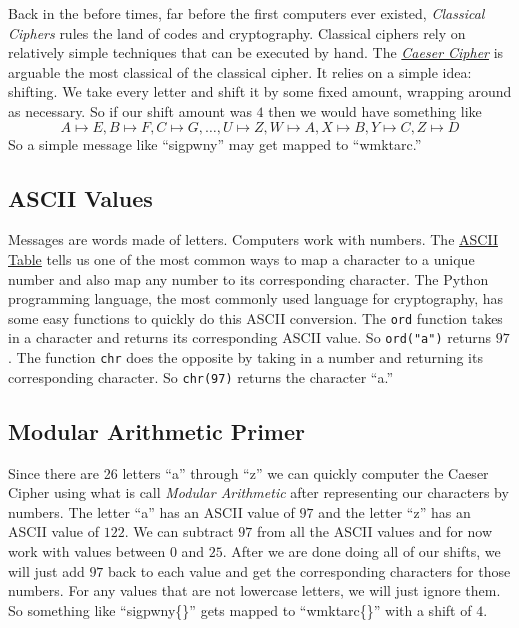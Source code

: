 \documentclass[letterpaper]{article}
\begin{document}
Back in the before times, far before the first computers ever existed, \emph{Classical Ciphers} rules the land of codes and cryptography.
Classical ciphers rely on relatively simple techniques that can be executed by hand.
The \href{https://en.wikipedia.org/wiki/Caesar_cipher}{\emph{Caeser Cipher}} is arguable the most classical of the classical cipher.
It relies on a simple idea: shifting.
We take every letter and shift it by some fixed amount, wrapping around as necessary.
So if our shift amount was $4$ then we would have something like
\[
  A \mapsto E, B \mapsto F,  C \mapsto G, \ldots, U \mapsto Z, W \mapsto A, X \mapsto B, Y \mapsto C, Z \mapsto D
\]
So a simple message like ``sigpwny'' may get mapped to ``wmktarc.''

\subsection*{ASCII Values}

Messages are words made of letters.
Computers work with numbers.
The \href{https://www.asciitable.com/}{ASCII Table} tells us one of the most common ways to map a character to a unique number and also map any number to its corresponding character.
The Python programming language, the most commonly used language for cryptography, has some easy functions to quickly do this ASCII conversion.
The \texttt{ord} function takes in a character and returns its corresponding ASCII value.
So \texttt{ord("a")} returns $97$.
The function \texttt{chr} does the opposite by taking in a number and returning its corresponding character.
So \texttt{chr(97)} returns the character ``a.''

\subsection*{Modular Arithmetic Primer}
Since there are 26 letters ``a'' through ``z'' we can quickly computer the Caeser Cipher using what is call \emph{Modular Arithmetic} after representing our characters by numbers.
The letter ``a'' has an ASCII value of $97$ and the letter ``z'' has an ASCII value of $122$.
We can subtract $97$ from all the ASCII values and for now work with values between $0$ and $25$.
After we are done doing all of our shifts, we will just add $97$ back to each value and get the corresponding characters for those numbers.
For any values that are not lowercase letters, we will just ignore them.
So something like ``sigpwny\{\}'' gets mapped to ``wmktarc\{\}'' with a shift of $4$.
\end{document}
